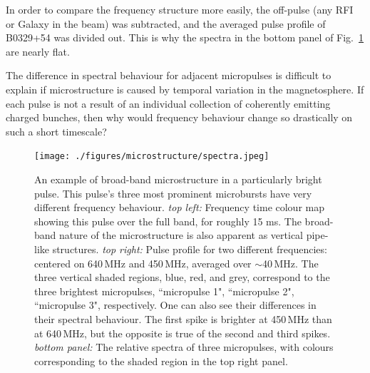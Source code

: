 In order to 
compare the frequency structure more easily, the off-pulse 
(any RFI or Galaxy in the beam) was subtracted, and the 
averaged pulse profile of B0329+54 was divided out.
This is why the spectra in the bottom panel of Fig.~\ref{fig-spectralvar}
are nearly flat. 

The difference in spectral behaviour for 
adjacent micropulses is difficult to explain 
if microstructure is caused by temporal 
variation in the magnetosphere. If each pulse is not a result 
of an individual collection of coherently emitting 
charged bunches, then why would frequency behaviour 
change so drastically on such a short timescale?

\begin{figure}[!h]
\vspace{-0.5cm}
\begin{center}
\texttt{[image: ./figures/microstructure/spectra.jpeg]}
\caption{An example of broad-band microstructure in a 
particularly bright pulse. This pulse's three most prominent 
microbursts have very different frequency behaviour. \textit{top left:}
Frequency time colour map showing this pulse over the 
full band, for roughly 15 ms. The broad-band nature of 
the microstructure is also apparent as 
vertical pipe-like structures. \textit{top right:} Pulse 
profile for two different frequencies: centered on 640\,MHz and 450\,MHz, 
averaged over $\sim$40\,MHz. The three vertical shaded regions, 
blue, red, and grey, correspond to the three brightest 
micropulses, ``micropulse 1", ``micropulse 2", ``micropulse 3", 
respectively. One can also see their differences in their 
spectral behaviour. The first spike is brighter at 450\,MHz
than at 640\,MHz, but the opposite is true of the
second and third spikes. \textit{bottom panel:} The relative 
spectra of three micropulses, with colours corresponding 
to the shaded region in the top right panel.}
\label{fig-spectralvar}
\end{center}
\end{figure}



